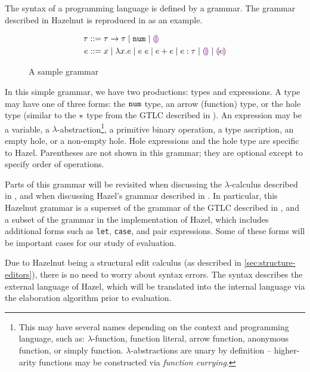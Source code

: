 The syntax of a programming language is defined by a grammar. The grammar described in Hazelnut \cite{conf/popl/Hazelnut17} is reproduced in  as an example.

\begin{figure}
  \centering
  \begin{mdframed}
    \begin{singlespace}
      \begin{align*}
        \tau &::= \tau\to\tau
               \mid\mathtt{num}
               \mid\textcolor{violet}{\llparenthesis}\textcolor{violet}{\rrparenthesis} \\
        e &::= x
            \mid\lambda x.e
            \mid e\ e
            \mid e+e
            \mid e:\tau
            \mid\textcolor{violet}{\llparenthesis}\textcolor{violet}{\rrparenthesis}
            \mid\textcolor{violet}{\llparenthesis} e\textcolor{violet}{\rrparenthesis}
      \end{align*}
    \end{singlespace}
  \end{mdframed}
  \caption{A sample grammar}
  \label{fig:sample-grammar}
\end{figure}

In this simple grammar, we have two productions: types and expressions. A type may have one of three forms: the $\mathtt{num}$ type, an arrow (function) type, or the hole type (similar to the $*$ type from the GTLC described in ). An expression may be a variable, a $\lambda$-abstraction\footnote{This may have several names depending on the context and programming language, such as: $\lambda$-function, function literal, arrow function, anonymous function, or simply function. $\lambda$-abstractions are unary by definition -- higher-arity functions may be constructed via \textit{function currying}.}, a primitive binary operation, a type ascription, an empty hole, or a non-empty hole. Hole expressions and the hole type are specific to Hazel. Parentheses are not shown in this grammar; they are optional except to specify order of operations.

Parts of this grammar will be revisited when discussing the $\lambda$-calculus described in , and when discussing Hazel's grammar described in . In particular, this Hazelnut grammar is a superset of the grammar of the GTLC described in , and a subset of the grammar in the implementation of Hazel, which includes additional forms such as \texttt{let}, \texttt{case}, and pair expressions. Some of these forms will be important cases for our study of evaluation.

Due to Hazelnut being a structural edit calculus (as described in \cref{sec:structure-editors}), there is no need to worry about syntax errors. The syntax describes the external language of Hazel, which will be translated into the internal language via the elaboration algorithm prior to evaluation.

